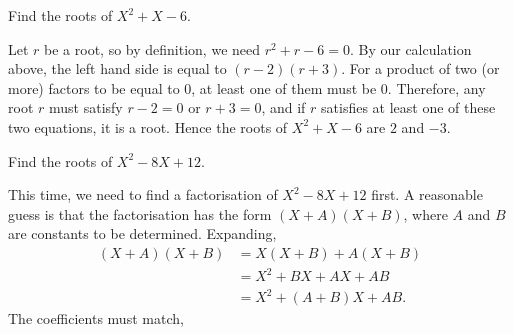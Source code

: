 \begin{example}
Find the roots of $X^2 + X - 6$. 
\end{example}
\begin{solution}
Let $r$ be a root, so by definition, we need $r^2 + r - 6 = 0$. By our calculation above, the left hand side is equal to $(r - 2)(r + 3)$. For a product of two (or more) factors to be equal to $0$, at least one of them must be $0$. Therefore, any root $r$ must satisfy $r - 2 = 0$ or $r + 3 = 0$, and if $r$ satisfies at least one of these two equations, it is a root. Hence the roots of $X^2 + X - 6$ are $2$ and $-3$.
\end{solution}

\begin{example}
Find the roots of $X^2 - 8X + 12$.
\end{example}
\begin{solution}
This time, we need to find a factorisation of $X^2 - 8X + 12$ first. A reasonable guess is that the factorisation has the form $(X + A)(X + B)$, where $A$ and $B$ are constants to be determined. Expanding,
\begin{align*}
(X + A)(X + B) &= X(X + B) + A(X + B) \\
&= X^2 + BX + AX + AB \\
&= X^2 + (A + B)X + AB.
\end{align*}
The coefficients must match, 
\end{solution}